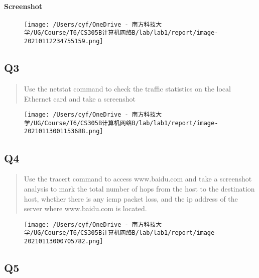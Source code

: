\documentclass[
]{article}
\begin{document}
\hypertarget{header-n35}{%
\paragraph{Screenshot}\label{header-n35}}

\begin{figure}
\centering
\texttt{[image: /Users/cyf/OneDrive - 南方科技大学/UG/Course/T6/CS305B计算机网络B/lab/lab1/report/image-20210112234755159.png]}
\caption{}
\end{figure}

\hypertarget{header-n37}{%
\subsection{Q3}\label{header-n37}}

\begin{quote}
Use the netstat command to check the traffic statistics on the local
Ethernet card and take a screenshot
\end{quote}

\begin{figure}
\centering
\texttt{[image: /Users/cyf/OneDrive - 南方科技大学/UG/Course/T6/CS305B计算机网络B/lab/lab1/report/image-20210113001153688.png]}
\caption{}
\end{figure}

\hypertarget{header-n41}{%
\subsection{Q4}\label{header-n41}}

\begin{quote}
Use the tracert command to access www.baidu.com and take a screenshot
analysis to mark the total number of hops from the host to the
destination host, whether there is any icmp packet loss, and the ip
address of the server where www.baidu.com is located.
\end{quote}

\begin{figure}
\centering
\texttt{[image: /Users/cyf/OneDrive - 南方科技大学/UG/Course/T6/CS305B计算机网络B/lab/lab1/report/image-20210113000705782.png]}
\caption{}
\end{figure}

\hypertarget{header-n45}{%
\subsection{Q5}\label{header-n45}}
\end{document}
